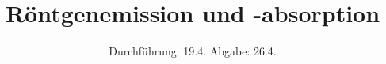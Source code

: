 

\subject{V 602}
\title{Röntgenemission und -absorption}
\date{
  Durchführung: 19.4.
  \hspace{3em}
  Abgabe: 26.4.
}



\maketitle
\thispagestyle{empty}
\tableofcontents
\newpage






\printbibliography


